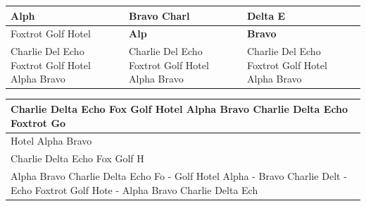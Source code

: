 \documentclass[11pt,a4paper]{article}
\begin{document}
\begin{table}[h]
\begin{tabular}{|l|l|l|}
\hline
Alph & Bravo Charl & Delta E \\ \hline
Foxtrot Golf Hotel & \textbf{Alp} & \textbf{Bravo}  \\ \hline
Charlie Del  Echo Foxtrot Golf Hotel Alpha Bravo  & Charlie Del  Echo Foxtrot Golf Hotel Alpha Bravo  & Charlie Del  Echo Foxtrot Golf Hotel Alpha Bravo  \\ \hline
\end{tabular}
\end{table}

\begin{table}[h]
\begin{tabular}{|l|}
\hline
Charlie Delta Echo Fox  Golf Hotel Alpha Bravo   Charlie Delta Echo Foxtrot Go \\ \hline
Hotel Alpha Bravo \\ \hline
Charlie Delta Echo Fox  Golf H \\ \hline
Alpha Bravo Charlie Delta Echo Fo  - Golf Hotel Alpha  - Bravo Charlie Delt - Echo Foxtrot Golf Hote - Alpha Bravo Charlie Delta Ech \\ \hline
\end{tabular}
\end{table}
\end{document}

